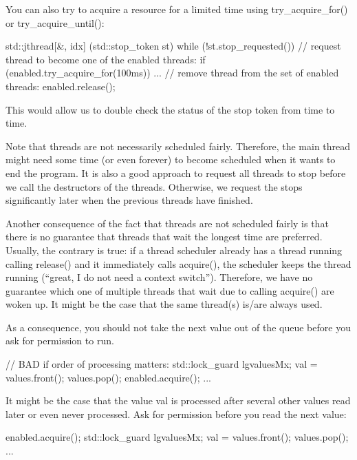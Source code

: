 You can also try to acquire a resource for a limited time using try\_acquire\_for() or try\_acquire\_until():

\begin{cpp}
std::jthread{[&, idx] (std::stop_token st) {
		while (!st.stop_requested()) {
			// request thread to become one of the enabled threads:
			if (enabled.try_acquire_for(100ms)) {
				...
				// remove thread from the set of enabled threads:
				enabled.release();
				}
			}
		}}
\end{cpp}

This would allow us to double check the status of the stop token from time to time.


Note that threads are not necessarily scheduled fairly. Therefore, the main thread might need some time (or even forever) to become scheduled when it wants to end the program. It is also a good approach to request all threads to stop before we call the destructors of the threads. Otherwise, we request the stops significantly later when the previous threads have finished.

Another consequence of the fact that threads are not scheduled fairly is that there is no guarantee that threads that wait the longest time are preferred. Usually, the contrary is true: if a thread scheduler already has a thread running calling release() and it immediately calls acquire(), the scheduler keeps the thread running (“great, I do not need a context switch”). Therefore, we have no guarantee which one of multiple threads that wait due to calling acquire() are woken up. It might be the case that the same thread(s) is/are always used.

As a consequence, you should not take the next value out of the queue before you ask for permission to run.

\begin{cpp}
// BAD if order of processing matters:
{
	std::lock_guard lg{valuesMx};
	val = values.front();
	values.pop();
}
enabled.acquire();
...
\end{cpp}

It might be the case that the value val is processed after several other values read later or even never processed. Ask for permission before you read the next value:

\begin{cpp}
enabled.acquire();
{
	std::lock_guard lg{valuesMx};
	val = values.front();
	values.pop();
}
...
\end{cpp}


